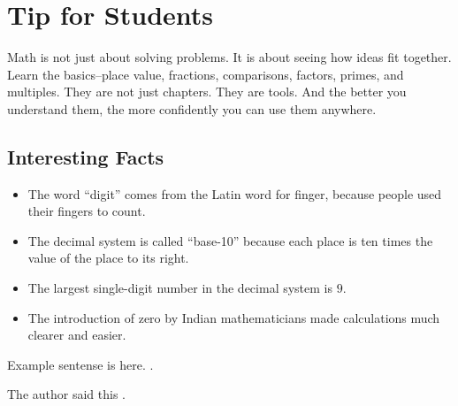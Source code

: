 \cleardoublepage

\section{Tip for Students}
Math is not just about solving problems. It is about seeing how ideas fit
together. Learn the basics--place value, fractions, comparisons, factors, primes,
and multiples. They are not just chapters. They are tools. And the better you
understand them, the more confidently you can use them anywhere.


\subsection*{Interesting Facts}

\begin{itemize}
  \item The word ``digit'' comes from the Latin word for finger, because people
        used their fingers to count.
  \item The decimal system is called ``base-10'' because each place is ten times
        the value of the place to its right.
  \item The largest single-digit number in the decimal system is \(9\).
  \item The introduction of zero by Indian mathematicians made calculations much
        clearer and easier.
\end{itemize}

Example sentense is here. \parencite[p.~359]{kim_ssat-sat_2003}.


 The author said this \parencite[p.~200]{noauthor_help_2010}.